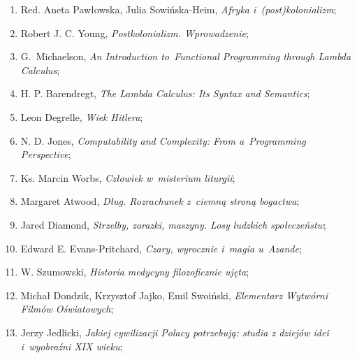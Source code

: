 \documentclass[a4paper,11pt]{article}
\begin{document}
\begin{enumerate}
\item Red. Aneta Pawłowska, Julia Sowińska-Heim, \textit{Afryka
    i~(post)kolonializm};



\item Robert J. C. Young, \textit{Postkolonializm. Wprowadzenie};



\item G.~Michaelson, \textit{An Introduction to~Functional Programming
    through Lambda Calculus};



\item H. P. Barendregt, \textit{The Lambda Calculus: Its Syntax and
    Semantics};



\item Leon Degrelle, \textit{Wiek Hitlera};



\item N. D. Jones, \textit{Computability and Complexity: From
    a~Programming Perspective};



\item Ks. Marcin Worbs, \textit{Człowiek w~misterium liturgii};



\item Margaret Atwood, \textit{Dług. Rozrachunek z~ciemną stroną
    bogactwa};



\item Jared Diamond, \textit{Strzelby, zarazki, maszyny. Losy ludzkich
    społeczeństw};



\item Edward E. Evans-Pritchard, \textit{Czary, wyrocznie i~magia
    u~Azande};



\item W. Szumowski, \textit{Historia medycyny filozoficznie ujęta};



\item Michał Dondzik, Krzysztof Jajko, Emil Swoiński, \textit{Elementarz
    Wytwórni Filmów Oświatowych};



\item Jerzy Jedlicki, \textit{Jakiej cywilizacji Polacy potrzebują:
    studia z dziejów idei i~wyobraźni XIX wieku};




\end{enumerate}
\end{document}
